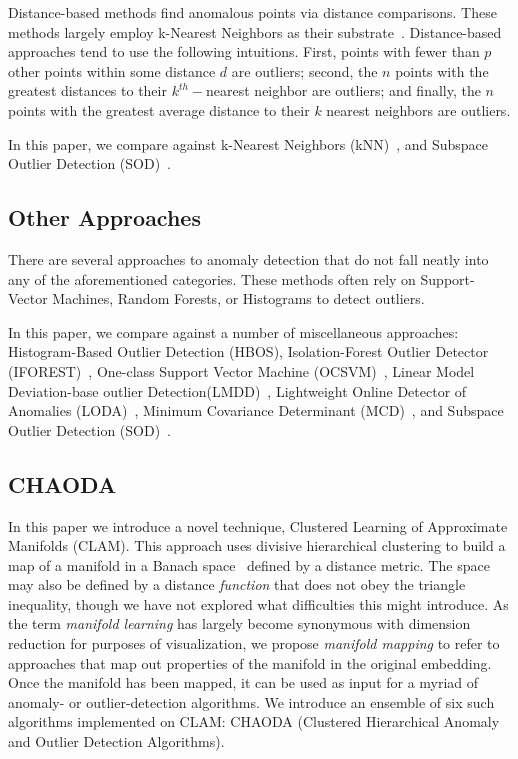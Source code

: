 Distance-based methods find anomalous points via distance comparisons.
These methods largely employ k-Nearest Neighbors as their substrate~\cite{wang2019progress}.
Distance-based approaches tend to use the following intuitions. First, points with fewer than $p$ other points within some distance $d$ are outliers; second, the $n$ points with the greatest distances to their $k^{th}-$nearest neighbor are outliers;
and finally, the $n$ points with the greatest average distance to their $k$ nearest neighbors are outliers.

In this paper, we compare against
k-Nearest Neighbors (kNN)~\cite{ramaswamy2000efficient, sridhar2000knn, fabrizio2002knn},
and Subspace Outlier Detection (SOD)~\cite{kriegel2009sod}.


\subsection{Other Approaches}
\label{subsec:introduction:other-appraoches}

There are several approaches to anomaly detection that do not fall neatly into any of the aforementioned categories.
These methods often rely on Support-Vector Machines, Random Forests, or Histograms to detect outliers.

In this paper, we compare against a number of miscellaneous approaches:
Histogram-Based Outlier Detection (HBOS)\cite{goldstein2012hbos},
Isolation-Forest Outlier Detector (IFOREST)~\cite{tony2008iforest,tony2012iforest},
One-class Support Vector Machine (OCSVM)~\cite{sholkopf2001ocsvm},
Linear Model Deviation-base outlier Detection(LMDD)~\cite{arning1996lmdd},
Lightweight Online Detector of Anomalies (LODA)~\cite{pevny2016loda},
Minimum Covariance Determinant (MCD)~\cite{rousseeuw1999mcd,hardin2004mcd},
and Subspace Outlier Detection (SOD)~\cite{kriegel2009sod}.


\subsection{CHAODA}
\label{subsec:introduction:chaoda}

In this paper we introduce a novel technique, Clustered Learning of Approximate Manifolds (CLAM).
This approach uses divisive hierarchical clustering to build a map of a manifold in a Banach space~\cite{banach1929fonctionnelles} defined by a distance metric.
The space may also be defined by a distance \textit{function} that does not obey the triangle inequality, though we have not explored what difficulties this might introduce.
As the term \emph{manifold learning} has largely become synonymous with dimension reduction for purposes of visualization, we propose \emph{manifold mapping} to refer to approaches that map out properties of the manifold in the original embedding.
Once the manifold has been mapped, it can be used as input for a myriad of anomaly- or outlier-detection algorithms.
We introduce an ensemble of six such algorithms implemented on CLAM: CHAODA (Clustered Hierarchical Anomaly and Outlier Detection Algorithms).

